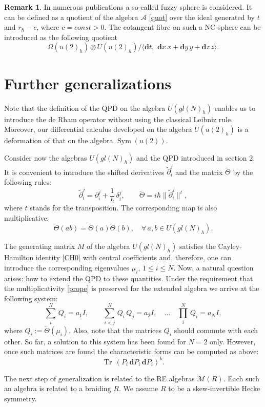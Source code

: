\documentclass[11pt]{article}
\newcommand{\pa}{\partial}
\DeclareMathOperator{\Tr}{Tr}
\newcommand{\MM}{\mathcal{M}}
\newcommand{\de}{\delta}
\newcommand{\ot}{\otimes}
\DeclareMathOperator{\Sym}{Sym}
\renewcommand{\AA}{\mathcal{A}}
\newcommand{\UU}{U(gl(N)_h)}
\newcommand{\UUU}{U(u(2)_h)}
\newcommand{\tpa}{\widetilde{\pa}}
\newcommand{\hh}{\hbar}
\newcommand{\tatt}{\widetilde{\Theta}}
\newcommand{\rh}{r_{\hbar}}
\newcommand{\Om}{\Omega}
\newcommand{\dd}{\mathbf{d}}
\numberwithin{equation}{section}
\theoremstyle{plain}
\theoremstyle{definition}
\newtheorem{remark}[theorem]{Remark}
\begin{document}
\begin{remark}
In  numerous publications a so-called fuzzy sphere is considered. It can be defined as a quotient of the algebra $\AA$ \eqref{quot}
	over the ideal generated by $t$ and
	$\rh-c$, where $c=const>0$. The cotangent fibre on such a NC sphere can be introduced as the following quotient
\[
	\Om(u(2)_h)\ot U(u(2)_h)/\langle \dd t,\,\, \dd x\, x+\dd y\, y+\dd z\, z \rangle.
\]
\end{remark}

\section{Further generalizations}\label{sec:generalizations}

Note that the definition of the QPD on the algebra $\UU$ enables us to introduce the de Rham operator without using the classical
Leibniz rule. Moreover, our differential calculus developed on the algebra $\UUU$ is a deformation of that on the algebra $\Sym(u(2))$.

Consider now the algebras $\UU$ and the QPD introduced in section 2. It is convenient to introduce the shifted
derivatives $\tpa_i^j$ and the matrix $\tatt$ by the following rules:
\[
\tpa_i^j=\pa_i^j+\frac{1}{h}\,\de_i^j,\qquad \tatt=i\hh\|\tpa_i^j\|^t,
\]
where $t$ stands for  the transposition. The corresponding map is also multiplicative:
\begin{equation}
\tatt(ab)= \tatt(a)\tatt(b),\quad \forall\, a,b \in \UU.
\label{prope}
\end{equation}

The generating matrix $M$ of the algebra $\UU$ satisfies the Cayley-Hamilton identity \eqref{CH0} with central coefficients and,
therefore, one can introduce the corresponding eigenvalues $\mu_i$, $1\le i\le N$. Now, a natural question arises: how to extend
the QPD to these quantities. Under the requirement that the multiplicativity \eqref{prope} is preserved for the extended algebra we
arrive at the following system:
\[
\sum_i^N\, Q_i=a_1 I,\qquad  \sum_{i<j}^N\, Q_i\, Q_j=a_2 I,\quad \dots\quad  \prod_{i}^N\, Q_i=a_N I,
\]
where $Q_i:=\tatt(\mu_i)$. Also, note that the matrices $Q_i$ should commute with each other. So far, a solution to this system
has been found for $N=2$ only. However, once such matrices are found the characteristic forms can be computed as above:
\[
\Tr\,(P_i\, \dd P_i\, \dd P_i)^k.
\]

The next step of  generalization is related to the RE algebras $\MM(R)$.  Each such an algebra is related to a
braiding $R$. We assume $R$ to be a skew-invertible Hecke symmetry.
\end{document}
